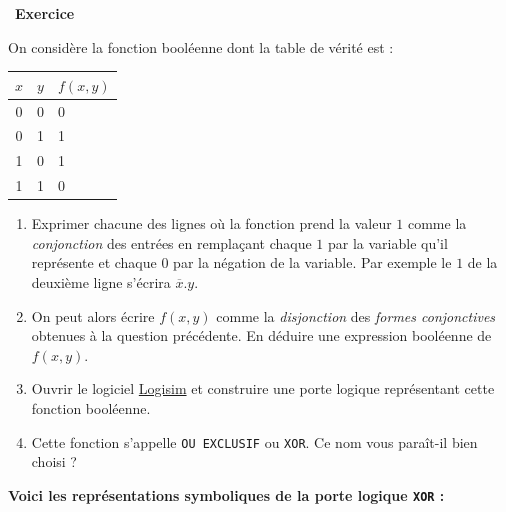 \documentclass[
  11pt,
]{article}
\newcommand{\passthrough}[1]{#1}
\providecommand{\tightlist}{%
  \setlength{\itemsep}{0pt}\setlength{\parskip}{0pt}}
\newcounter{exo}
\newenvironment{exercice}[1]
{\par \medskip   \addtocounter{exo}{1} \noindent  
\begin{bclogo}[arrondi =0.1,   noborder = true, logo=\bccrayon, marge=4]{~\textbf{Exercice} \textbf{\theexo} {\itshape #1} }  \par}
{
\end{bclogo}
 \par \bigskip }
\newcounter{def}
\newcounter{logi}
\begin{document}
\begin{exercice}{}

On considère la fonction booléenne dont la table de vérité est :

\begin{longtable}[]{@{}cll@{}}
\toprule
\(x\) & \(y\) & \(f(x, y)\)\tabularnewline
\midrule
\endhead
0 & 0 & 0\tabularnewline
0 & 1 & 1\tabularnewline
1 & 0 & 1\tabularnewline
1 & 1 & 0\tabularnewline
\bottomrule
\end{longtable}

\begin{enumerate}
\def\labelenumi{\arabic{enumi}.}
\tightlist
\item
  Exprimer chacune des lignes où la fonction prend la valeur \(1\) comme
  la \emph{conjonction} des entrées en remplaçant chaque \(1\) par la
  variable qu'il représente et chaque \(0\) par la négation de la
  variable. Par exemple le \(1\) de la deuxième ligne s'écrira
  \(\overline{x} . y\).
\item
  On peut alors écrire \(f(x,y)\) comme la \emph{disjonction} des
  \emph{formes conjonctives} obtenues à la question précédente. En
  déduire une expression booléenne de \(f(x, y)\).
\item
  Ouvrir le logiciel \href{http://www.cburch.com/logisim/}{Logisim} et
  construire une porte logique représentant cette fonction booléenne.
\item
  Cette fonction s'appelle \passthrough{\lstinline!OU EXCLUSIF!} ou
  \passthrough{\lstinline!XOR!}. Ce nom vous paraît-il bien choisi ?
\end{enumerate}

\end{exercice}

\textbf{Voici les représentations symboliques de la porte logique
\passthrough{\lstinline!XOR!} :}
\end{document}
